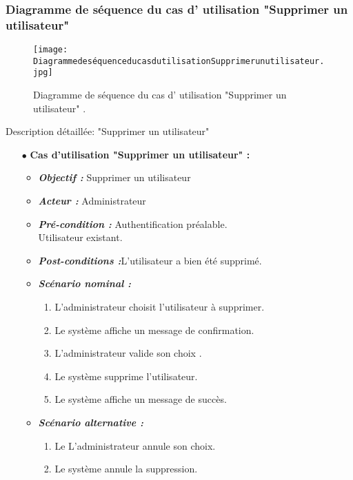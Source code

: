 \subsubsection{Diagramme de séquence du cas d' utilisation "Supprimer un utilisateur" }
\begin{figure}[ht]
	\centering
	\texttt{[image: DiagrammedeséquenceducasdutilisationSupprimerunutilisateur.jpg]}
	\caption{ Diagramme de séquence du cas d' utilisation "Supprimer un utilisateur"  .}
	\label{fig: Diagramme de séquence du cas d' utilisation Supprimer un utilisateur  }
\end{figure}
\FloatBarrier
\clearpage	
{\Large \color{cyan} Description détaillée: "Supprimer un utilisateur"}
\begin{itemize}
	\item[$\bullet$] \textbf{Cas d’utilisation "Supprimer un utilisateur" :} 
	\medskip
	\begin{itemize}
		\item \textit{\textbf{Objectif :}} Supprimer un utilisateur	
		\item \textit{\textbf{Acteur :}} Administrateur	
		\item \textit{\textbf{Pré-condition  :}} Authentification préalable.\\
		Utilisateur existant.
		\item \textit{\textbf{Post-conditions   :}}L’utilisateur a bien été supprimé.
		\item \textit{\textbf{Scénario nominal :}}
		\begin{enumerate}
			\item L’administrateur choisit l’utilisateur à supprimer. 
			\item Le système affiche un message de confirmation. 
			\item  L’administrateur valide son choix . 
			\item  Le système supprime l’utilisateur.  
			\item Le système affiche un message de succès.
		\end{enumerate}
		\item \textit{\textbf{Scénario alternative :}}
		\begin{enumerate}
			\item Le L’administrateur annule son choix.
			\item Le système annule la suppression.
		\end{enumerate}
	\end{itemize}
\end{itemize}	
